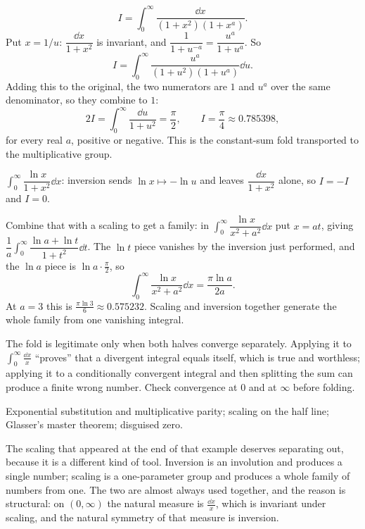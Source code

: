 \begin{worked}
\[I=\int_0^{\infty}\frac{\dd x}{(1+x^{2})(1+x^{a})}.\]
Put $x=1/u$: $\dfrac{\dd x}{1+x^{2}}$ is invariant, and $\dfrac{1}{1+u^{-a}}=\dfrac{u^{a}}{1+u^{a}}$. So
\[I=\int_0^{\infty}\frac{u^{a}}{(1+u^{2})(1+u^{a})}\dd u.\]
Adding this to the original, the two numerators are $1$ and $u^{a}$ over the same denominator, so they combine to $1$:
\[2I=\int_0^{\infty}\frac{\dd u}{1+u^{2}}=\frac{\pi}{2},\qquad I=\frac{\pi}{4}\approx0.785398,\]
for every real $a$, positive or negative. This is the constant-sum fold transported to the multiplicative group.
\end{worked}

\begin{worked}
$\int_0^{\infty}\dfrac{\ln x}{1+x^{2}}\dd x$: inversion sends $\ln x\mapsto-\ln u$ and leaves $\dfrac{\dd x}{1+x^{2}}$ alone, so $I=-I$ and $I=0$.

Combine that with a scaling to get a family: in $\int_0^{\infty}\dfrac{\ln x}{x^{2}+a^{2}}\dd x$ put $x=at$, giving $\dfrac1a\int_0^{\infty}\dfrac{\ln a+\ln t}{1+t^{2}}\dd t$. The $\ln t$ piece vanishes by the inversion just performed, and the $\ln a$ piece is $\ln a\cdot\tfrac{\pi}{2}$, so
\[\int_0^{\infty}\frac{\ln x}{x^{2}+a^{2}}\dd x=\frac{\pi\ln a}{2a}.\]
At $a=3$ this is $\tfrac{\pi\ln3}{6}\approx0.575232$. Scaling and inversion together generate the whole family from one vanishing integral.
\end{worked}

\begin{trap}
The fold is legitimate only when both halves converge separately. Applying it to $\int_0^{\infty}\tfrac{\dd x}{x}$ ``proves'' that a divergent integral equals itself, which is true and worthless; applying it to a conditionally convergent integral and then splitting the sum can produce a finite wrong number. Check convergence at $0$ and at $\infty$ before folding.
\end{trap}

\begin{seealsob}Exponential substitution and multiplicative parity; scaling on the half line; Glasser's master theorem; disguised zero.\end{seealsob}

The scaling that appeared at the end of that example deserves separating out, because it is a different kind of tool. Inversion is an involution and produces a single number; scaling is a one-parameter group and produces a whole family of numbers from one. The two are almost always used together, and the reason is structural: on $(0,\infty)$ the natural measure is $\tfrac{\dd x}{x}$, which is invariant under scaling, and the natural symmetry of that measure is inversion.

